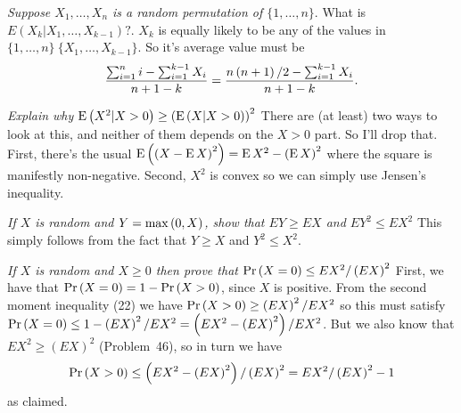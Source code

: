  {\it Suppose $X_1, \ldots, X_n$ is a random permutation of 
$\{1, \ldots, n\}$}.  What is $E\left(X_k | X_1, \ldots, X_{k-1}\right)?$.\hfil\break
$X_k$ is equally likely to be any of the values in 
$\{1, \ldots, n\} \ \{X_1, \ldots, X_{k-1}\}$.  So it's average value must be
$$
 {
  \sum_{i=1}^n i - \sum_{i=1}^{k-1} X_i \over n + 1 - k
 } = {
  n \left(n + 1\right) / 2 - \sum_{i=1}^{k-1} X_i \over n + 1 - k
 }.
$$

 {\it Explain why ${\rm E}\left(X^2 | X > 0\right) \geq 
\left({\rm E} \left(X | X > 0\right)\right)^2$}\hfil\break
There are (at least) two ways to look at this, and neither of them depends on the $X > 0$
part.  So I'll drop that.  First, there's the usual ${\rm E}\left( \left(X - {\rm E} \, X\right)^2 \right) =
{\rm E} \, X^2 - \left({\rm E}\, X\right)^2$ where the square is manifestly non-negative.
Second, $X^2$ is convex so we can simply use Jensen's inequality.

 {\it If $X$ is random and $Y = {\rm max}\left(0, X\right)$,
show that $E Y \ge E X$ and $E Y^2 \le E X^2$} \hfil\break
This simply follows from the fact that $Y \ge X$ and $Y^2 \le X^2$.

 {\it If $X$ is random and $X \ge 0$ then prove that
 ${\rm Pr}\left(X = 0\right) \le E X^2 / \left(E X\right)^2$}\hfil\break
 First, we have that ${\rm Pr}\left(X = 0\right) = 1 - {\rm Pr} \left(X > 0\right)$,
 since $X$ is positive.  From the second moment inequality (22) we have
 ${\rm Pr}\left(X > 0\right) \ge \left(E X\right)^2 / E X^2$ so this must satisfy
 ${\rm Pr}\left(X = 0\right) \le 1 - \left(E X\right)^2 / E X^2 =
 \left(E X^2 - \left( E X \right)^2\right) / E X^2$.  But we also know that
 $E X^2 \ge \left(E X\right)^2$ (Problem~46), so in turn we have
 $$
 {\rm Pr}\left(X > 0\right) 
  \le \left(E X^2 - \left(E X\right)^2\right) / \left(E X\right)^2
  = E X^2 / \left(E X\right)^2 - 1
$$ 
as claimed.

